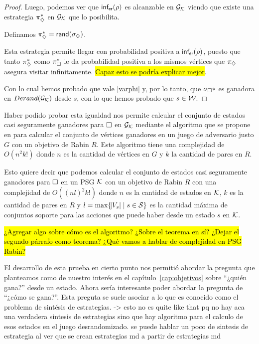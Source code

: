 \begin{proof}
	Luego, podemos ver que $\textsf{inf}_\textsf{er}(\rho)$ es alcanzable en $\mathcal{G}_{\mathcal{K}}$ viendo que existe
	una estrategia $\pi_\diamondsuit^*$ en $\mathcal{G}_{\mathcal{K}}$ que lo posibilita.

	Definamos $\pi_\diamondsuit^* = \textsf{rand}(\sigma_\diamondsuit)$.

	Esta estrategia permite llegar con probabilidad positiva a $\textsf{inf}_\textsf{er}(\rho)$,
	puesto que tanto $\pi_\diamondsuit^*$ como $\pi_\square^*$ le da probabilidad positiva a los
	mismos vértices que $\pi_\diamondsuit$ asegura visitar infinitamente. \hl{Capaz esto se
		podría explicar mejor}.

	Con lo cual hemos probado que vale \ref{varphi} y, por lo tanto, que
	$\sigma_\square*$ es ganadora en $Derand(\mathcal{G}_{\mathcal{K}})$ desde $s$, con lo que hemos probado que
	$s \in \mathcal{W}$.

\end{proof}

Haber podido probar esta igualdad nos permite calcular el conjunto de estados
casi seguramente ganadores para $\square$ en $\mathcal{G}_{\mathcal{K}}$ mediante el algoritmo que se
propone en \cite{Banerjee} para calcular el conjunto de vértices ganadores en
un juego de adversario justo $G$ con un objetivo de Rabin $R$. Este algoritmo
tiene una complejidad de $O(n^2 k!)$ donde $n$ es la cantidad de vértices en
$G$ y $k$ la cantidad de pares en $R$.

Esto quiere decir que podemos calcular el conjunto de estados casi seguramente
ganadores para $\square$ en un PSG $\mathcal{K}$ con un objetivo de Rabin $R$ con una
complejidad de $O((n l)^2 k! )$ donde $n$ es la cantidad de estados en $\mathcal{K}$,
$k$ es la cantidad de pares en $R$ y $l = \max \{\abs{V_s} \mid s \in \mathcal{S} \}$
es la cantidad máxima de conjuntos soporte para las acciones que puede haber
desde un estado $s$ en $\mathcal{K}$.

\hl{¿Agregar algo sobre cómo es el algoritmo? ¿Sobre el teorema en sí? ¿Dejar el segundo párrafo como teorema? ¿Qué vamos a hablar de complejidad en PSG Rabin?}

El desarrollo de esta prueba en cierto punto nos permitió abordar la pregunta
que planteamos como de nuestro interés en el capítulo~\ref{cap:objetivos} sobre
``¿quién gana?'' desde un estado. Ahora sería interesante poder abordar la
pregunta de ``¿cómo se gana?''. Esta preguta se suele asociar a lo que es
conocido como el problema de sintésis de estrategias. -> esto no es quite like
that pq no hay aca una verdadera sintesis de estrategias sino que hay algoritmo
para el calculo de esos estados en el juego desrandomizado. se puede hablar un
poco de sintesis de estrategia al ver que se crean estrategias md a partir de
estrategias md